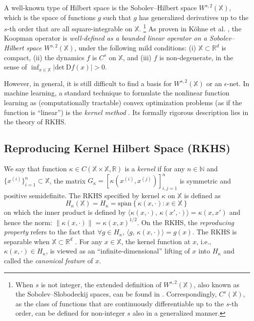 \documentclass[english]{cccconf}
\renewcommand{\emph}[1]{\textit{#1}}
\newcommand{\mr}[1]{\mathrm{#1}}
\newcommand{\mbb}[1]{\mathds{#1}} %
\newcommand{\mR}{\mbb{R}}
\newcommand{\mN}{\mbb{N}}
\newcommand{\mX}{\mbb{X}}
\newcommand{\bra}[1]{\left( #1 \right)}
\newcommand{\Bra}[1]{\left[ #1 \right]}
\newcommand{\BRA}[1]{\left\{ #1 \right\}}
\newcommand{\ip}[2]{\langle #1, \, #2 \rangle}
\begin{document}
\par A well-known type of Hilbert space is the Sobolev--Hilbert space $W^{s, 2}(\mX)$, which is the space of functions $g$ such that $g$ has generalized derivatives up to the $s$-th order that are all square-integrable on $\mX$. 
\footnote{When $s$ is not integer, the extended definition of $W^{s,2}(\mX)$, also known as the Sobolev--Slobodeckij spaces, can be found in  \cite{zhang2025introduction}. Correspondingly, $C^s(\mX)$, as the class of functions that are continuously differentiable up to the $s$-th order, can be defined for non-integer $s$ also in a generalized manner.} 
As proven in K{\"{o}}hne et al. \cite{kohne2025Linf}, the Koopman operator is \emph{well-defined as a bounded linear operator on a Sobolev--Hilbert space $W^{s,2}(\mX)$}, under the following mild conditions: 
(i) $\mX\subset \mR^d$ is compact, (ii) the dynamics $f$ is $C^s$ on $\mX$, and (iii) $f$ is non-degenerate, in the sense of $\inf_{x\in \mX} \lvert \mr{det}~\mr{D}f(x) \rvert > 0$. 

\par However, in general, it is still difficult to find a basis for $W^{s,2}(\mX)$ or an $\epsilon$-net. 
In machine learning, a standard technique to formulate the nonlinear function learning as (computationally tractable) convex optimization problems (as if the function is ``linear'') is the \emph{kernel method} \cite{steinwart2008support}. 
Its formally rigorous description lies in the theory of RKHS. 


\subsection{Reproducing Kernel Hilbert Space (RKHS)} 
We say that function $\kappa \in C(\mX\times \mX, \mR)$ is a \emph{kernel} if for any $n\in \mN$ and $\{x^{(i)}\}_{i=1}^n \subset \mbb{X}$, the matrix $G_\kappa = \Bra{ \kappa\bra{x^{(i)}, x^{(j)}} }_{i,j=1}^n$ is symmetric and positive semidefinite. 
The RKHS specified by kernel $\kappa$ on $\mX$ is defined as
$$H_\kappa(\mX) = H_\kappa = \overline{\mr{span}}\BRA{\kappa(x, \cdot): x\in \mX}$$
on which the inner product is defined by $\ip{\kappa(x,\cdot)}{\kappa(x',\cdot)} = \kappa(x,x')$ and hence the norm: $\|\kappa(x, \cdot)\| = \kappa(x,x)^{1/2}$. 
On the RKHS, the \emph{reproducing property} refers to the fact that $\forall g\in H_\kappa$, $\ip{g}{\kappa(x, \cdot)} = g(x)$. The RKHS is separable when $\mX \subset \mR^d$ \cite{steinwart2008support}. For any $x\in \mX$, the kernel function at $x$, i.e., $\kappa(x,\cdot) \in H_\kappa$, is viewed as an ``infinite-dimensional'' lifting of $x$ into $H_\kappa$ and called the \emph{canonical feature} of $x$. 
\end{document}
